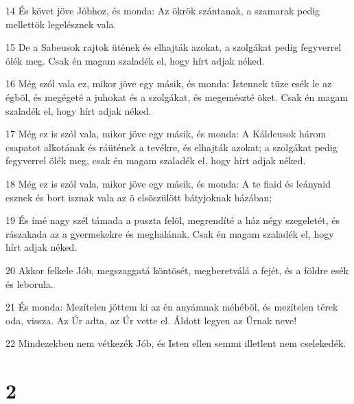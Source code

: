 \par 14 És követ jöve Jóbhoz, és monda: Az ökrök szántanak, a szamarak pedig mellettök legelésznek vala.
\par 15 De a Sabeusok rajtok ütének és elhajták azokat, a szolgákat pedig fegyverrel ölék meg. Csak én magam szaladék el, hogy hírt adjak néked.
\par 16 Még szól vala ez, mikor jöve egy másik, és monda: Istennek tüze esék le az égbõl, és megégeté a juhokat és a szolgákat, és megemészté õket. Csak én magam szaladék el, hogy hírt adjak néked.
\par 17 Még ez is szól vala, mikor jöve egy másik, és monda: A Káldeusok három csapatot alkotának és ráütének a tevékre, és elhajták azokat; a szolgákat pedig fegyverrel ölék meg, csak én magam szaladék el, hogy hírt adjak néked.
\par 18 Még ez is szól vala, mikor jöve egy másik, és monda: A te fiaid és leányaid esznek és bort isznak vala az õ elsõszülött bátyjoknak házában;
\par 19 És ímé nagy szél támada a puszta felõl, megrendíté a ház négy szegeletét, és rászakada az a gyermekekre és meghalának. Csak én magam szaladék el, hogy hírt adjak néked.
\par 20 Akkor felkele Jób, megszaggatá köntösét, megberetválá a fejét, és a földre esék és leborula.
\par 21 És monda: Mezítelen jöttem ki az én anyámnak méhébõl, és mezítelen térek oda,  vissza. Az Úr adta, az Úr vette el. Áldott legyen az Úrnak neve!
\par 22 Mindezekben nem vétkezék Jób, és Isten ellen semmi illetlent nem cselekedék.

\chapter{2}

